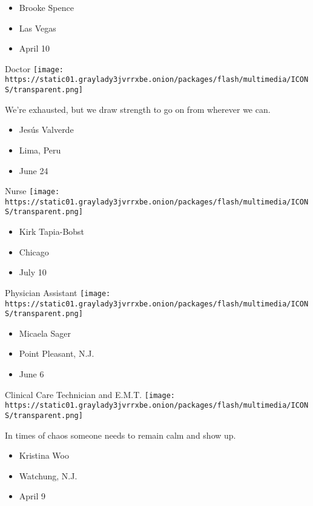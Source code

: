 \begin{itemize}
\tightlist
\item
  Brooke Spence
\item
  Las Vegas
\item
  April 10
\end{itemize}

\protect\hyperlink{item-jesus-valverde}{}

Doctor
\texttt{[image: https://static01.graylady3jvrrxbe.onion/packages/flash/multimedia/ICONS/transparent.png]}

We're exhausted, but we draw strength to go on from wherever we can.

\begin{itemize}
\tightlist
\item
  Jesús Valverde
\item
  Lima, Peru
\item
  June 24
\end{itemize}

\protect\hyperlink{item-kirk-tapia-bobst}{}

Nurse
\texttt{[image: https://static01.graylady3jvrrxbe.onion/packages/flash/multimedia/ICONS/transparent.png]}

\begin{itemize}
\tightlist
\item
  Kirk Tapia-Bobst
\item
  Chicago
\item
  July 10
\end{itemize}

\protect\hyperlink{item-micaela-sager}{}

Physician Assistant
\texttt{[image: https://static01.graylady3jvrrxbe.onion/packages/flash/multimedia/ICONS/transparent.png]}

\begin{itemize}
\tightlist
\item
  Micaela Sager
\item
  Point Pleasant, N.J.
\item
  June 6
\end{itemize}

\protect\hyperlink{item-kristina-woo}{}

Clinical Care Technician and E.M.T.
\texttt{[image: https://static01.graylady3jvrrxbe.onion/packages/flash/multimedia/ICONS/transparent.png]}

In times of chaos someone needs to remain calm and show up.

\begin{itemize}
\tightlist
\item
  Kristina Woo
\item
  Watchung, N.J.
\item
  April 9
\end{itemize}

